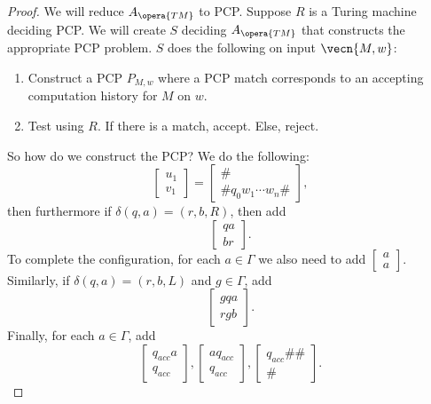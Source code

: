 \begin{proof}
	We will reduce $A_{\opera{TM}}$ to PCP. Suppose $R$ is a Turing machine deciding PCP. We will create $S$ deciding $A_{\opera{TM}}$ that constructs the appropriate PCP problem.
	$S$ does the following on input $\vecn{M,w}$:
	\begin{enumerate}
		\item Construct a PCP $P_{M,w}$ where a PCP match corresponds to an accepting computation history for $M$ on $w$.
		\item Test using $R$. If there is a match, accept. Else, reject.
	\end{enumerate}
	So how do we construct the PCP?
	We do the following: \[
		\begin{bmatrix} u_1 \\ v_1 \end{bmatrix} = \begin{bmatrix} \# \\ \# q_0 w_1 \cdots w_n \# \end{bmatrix},
	\]
	then furthermore if $\delta(q,a) = (r, b, R)$, then add \[
		\begin{bmatrix} 
			qa \\ br
		\end{bmatrix}.
	\]
	To complete the configuration, for each $a\in \Gamma$ we also need to add $\begin{bmatrix} a \\ a \end{bmatrix}$.
	Similarly, if $\delta(q,a) = (r, b, L)$ and $g\in \Gamma$, add \[
		\begin{bmatrix}
			gqa \\ rgb
		\end{bmatrix}.
	\]
	Finally, for each $a\in \Gamma$, add \[
		\begin{bmatrix} q_{acc}a \\ q_{acc} \end{bmatrix}, 
		\begin{bmatrix} aq_{acc} \\ q_{acc} \end{bmatrix},
		\begin{bmatrix} q_{acc}\#\# \\ \# \end{bmatrix}.
	\]
\end{proof}
